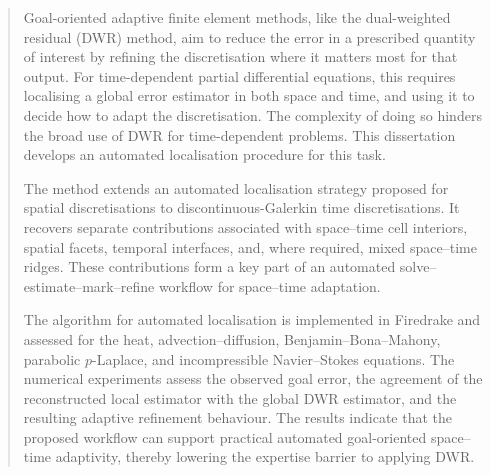 \begin{abstract}

Goal-oriented adaptive finite element methods, like the dual-weighted residual (DWR) method, aim to reduce the error in a prescribed quantity of interest by refining the discretisation where it matters most for that output. For time-dependent partial differential equations, this requires localising a global error estimator in both space and time, and using it to decide how to adapt the discretisation. The complexity of doing so hinders the broad use of DWR for time-dependent problems. This dissertation develops an automated localisation procedure for this task.

The method extends an automated localisation strategy proposed for spatial discretisations to discontinuous-Galerkin time discretisations. It recovers separate contributions associated with space--time cell interiors, spatial facets, temporal interfaces, and, where required, mixed space--time ridges. These contributions form a key part of an automated solve--estimate--mark--refine workflow for space--time adaptation.

The algorithm for automated localisation is implemented in Firedrake and assessed for the heat, advection--diffusion, Benjamin--Bona--Mahony, parabolic \(p\)-Laplace, and incompressible Navier--Stokes equations. The numerical experiments assess the observed goal error, the agreement of the reconstructed local estimator with the global DWR estimator, and the resulting adaptive refinement behaviour. The results indicate that the proposed workflow can support practical automated goal-oriented space--time adaptivity, thereby lowering the expertise barrier to applying DWR.

\end{abstract}

